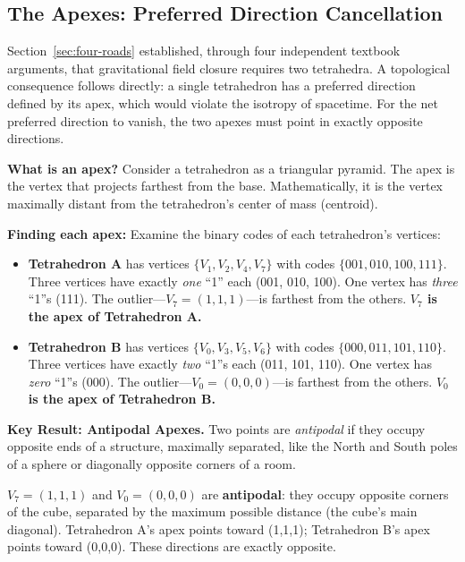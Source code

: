 \documentclass[aps,prd,preprint,superscriptaddress,showpacs,preprintnumbers,amsmath,amssymb,nofootinbib]{revtex4-2}
\begin{document}
\subsection{The Apexes: Preferred Direction Cancellation}
\label{subsec:apexes}

Section~\ref{sec:four-roads} established, through four independent textbook arguments, that gravitational field closure requires two tetrahedra. A topological consequence follows directly: a single tetrahedron has a preferred direction defined by its apex, which would violate the isotropy of spacetime. For the net preferred direction to vanish, the two apexes must point in exactly opposite directions.

\textbf{What is an apex?} Consider a tetrahedron as a triangular pyramid. The apex is the vertex that projects farthest from the base. Mathematically, it is the vertex maximally distant from the tetrahedron's center of mass (centroid).

\textbf{Finding each apex:} Examine the binary codes of each tetrahedron's vertices:

\begin{itemize}
\item \textbf{Tetrahedron A} has vertices $\{V_1, V_2, V_4, V_7\}$ with codes $\{001, 010, 100, 111\}$. Three vertices have exactly \emph{one} ``1'' each (001, 010, 100). One vertex has \emph{three} ``1''s (111). The outlier---$V_7 = (1,1,1)$---is farthest from the others. \textbf{$V_7$ is the apex of Tetrahedron A.}
\item \textbf{Tetrahedron B} has vertices $\{V_0, V_3, V_5, V_6\}$ with codes $\{000, 011, 101, 110\}$. Three vertices have exactly \emph{two} ``1''s each (011, 101, 110). One vertex has \emph{zero} ``1''s (000). The outlier---$V_0 = (0,0,0)$---is farthest from the others. \textbf{$V_0$ is the apex of Tetrahedron B.}
\end{itemize}

\textbf{Key Result: Antipodal Apexes.} Two points are \emph{antipodal} if they occupy opposite ends of a structure, maximally separated, like the North and South poles of a sphere or diagonally opposite corners of a room.

$V_7 = (1,1,1)$ and $V_0 = (0,0,0)$ are \textbf{antipodal}: they occupy opposite corners of the cube, separated by the maximum possible distance (the cube's main diagonal). Tetrahedron A's apex points toward (1,1,1); Tetrahedron B's apex points toward (0,0,0). These directions are exactly opposite.
\end{document}

